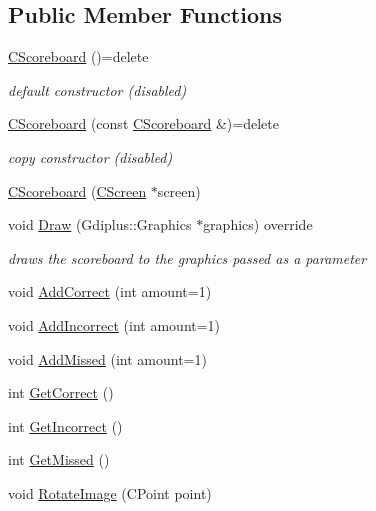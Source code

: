 \subsection*{Public Member Functions}
\begin{DoxyCompactItemize}
\item 
\mbox{\label{class_c_scoreboard_a1e65cc402934fea467540cce987cc9a1}} 
\mbox{\hyperlink{class_c_scoreboard_a1e65cc402934fea467540cce987cc9a1}{C\+Scoreboard}} ()=delete
\begin{DoxyCompactList}\small\item\em default constructor (disabled) \end{DoxyCompactList}\item 
\mbox{\label{class_c_scoreboard_a2de2543790f6133fb67e5d23fbd93d9d}} 
\mbox{\hyperlink{class_c_scoreboard_a2de2543790f6133fb67e5d23fbd93d9d}{C\+Scoreboard}} (const \mbox{\hyperlink{class_c_scoreboard}{C\+Scoreboard}} \&)=delete
\begin{DoxyCompactList}\small\item\em copy constructor (disabled) \end{DoxyCompactList}\item 
\mbox{\hyperlink{class_c_scoreboard_ad3a0f3c1030fdd94c50ce7b61a412296}{C\+Scoreboard}} (\mbox{\hyperlink{class_c_screen}{C\+Screen}} $\ast$screen)
\item 
\mbox{\label{class_c_scoreboard_a43f1b32f96b09b649b9052b97da81d4b}} 
void \mbox{\hyperlink{class_c_scoreboard_a43f1b32f96b09b649b9052b97da81d4b}{Draw}} (Gdiplus\+::\+Graphics $\ast$graphics) override
\begin{DoxyCompactList}\small\item\em draws the scoreboard to the graphics passed as a parameter \end{DoxyCompactList}\item 
void \mbox{\hyperlink{class_c_scoreboard_ab171509b39d2604fe9ba65a4a8205fc1}{Add\+Correct}} (int amount=1)
\item 
void \mbox{\hyperlink{class_c_scoreboard_a931d264ccc846f1c91db0ef875ba0389}{Add\+Incorrect}} (int amount=1)
\item 
void \mbox{\hyperlink{class_c_scoreboard_a22c18eda1cb527d4fc2102486132f0b1}{Add\+Missed}} (int amount=1)
\item 
int \mbox{\hyperlink{class_c_scoreboard_a7c961d101942e7d7b42294105457d828}{Get\+Correct}} ()
\item 
int \mbox{\hyperlink{class_c_scoreboard_a230139e41c56f0aacf3a82b41034db27}{Get\+Incorrect}} ()
\item 
int \mbox{\hyperlink{class_c_scoreboard_a99d95c0502e4ca08a2cf867568998065}{Get\+Missed}} ()
\item 
void \mbox{\hyperlink{class_c_scoreboard_a86ec1f448410e12d88939ebaa5292a29}{Rotate\+Image}} (C\+Point point)
\end{DoxyCompactItemize}
